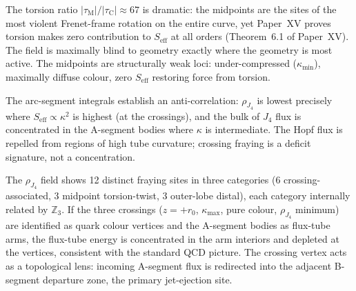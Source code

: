 \begin{remark}
\label{P16:rem:torsion_contrast}
The torsion ratio $|\tau_{\mathrm{M}}|/|\tau_{\mathrm{C}}|\approx67$ is
dramatic: the midpoints are the sites of the most violent Frenet-frame
rotation on the entire curve, yet Paper~XV proves torsion makes zero
contribution to $S_{\mathrm{eff}}$ at all orders (Theorem~6.1 of Paper~XV).
The field is maximally blind to geometry exactly where the geometry is most
active. The midpoints are structurally weak loci: under-compressed
($\kappa_{\min}$), maximally diffuse colour, zero $S_{\mathrm{eff}}$
restoring force from torsion.
\end{remark}

\begin{remark}
\label{P16:rem:rhoJ4_anticorrelation}
The arc-segment integrals establish an anti-correlation: $\rho_{J_4}$ is
lowest precisely where $S_{\mathrm{eff}}\propto\kappa^2$ is highest (at
the crossings), and the bulk of $J_4$ flux is concentrated in the A-segment
bodies where $\kappa$ is intermediate. The Hopf flux is repelled from
regions of high tube curvature; crossing fraying is a deficit signature,
not a concentration.
\end{remark}

\begin{remark}
\label{P16:rem:arcseg_physics}
The $\rho_{J_4}$ field shows 12 distinct fraying sites in three categories
(6 crossing-associated, 3 midpoint torsion-twist, 3 outer-lobe distal),
each category internally related by $\mathbb{Z}_3$. If the three crossings
($z=+r_0$, $\kappa_{\max}$, pure colour, $\rho_{J_4}$ minimum) are
identified as quark colour vertices and the A-segment bodies as flux-tube
arms, the flux-tube energy is concentrated in the arm interiors and depleted
at the vertices, consistent with the standard QCD picture. The crossing
vertex acts as a topological lens: incoming A-segment flux is redirected
into the adjacent B-segment departure zone, the primary jet-ejection site.
\end{remark}

